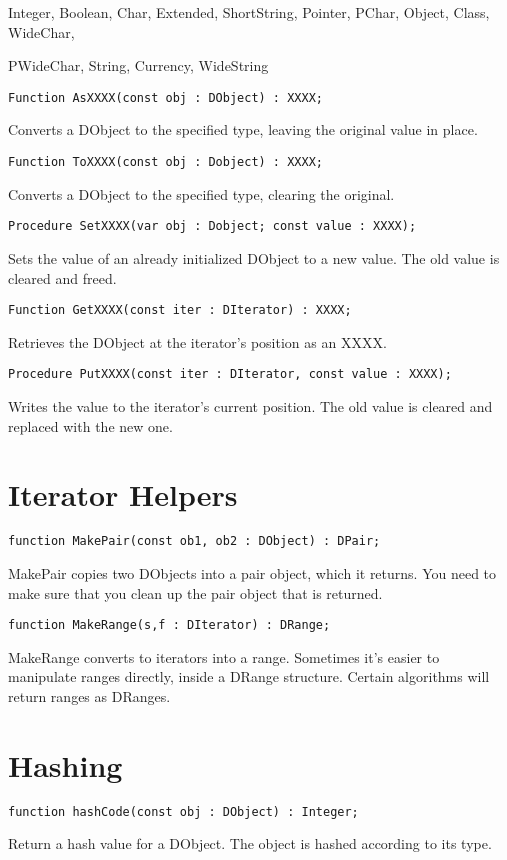 \documentclass{report}
\begin{document}
Integer, Boolean, Char, Extended, ShortString, Pointer, PChar, 
Object, Class, WideChar,

PWideChar, String, Currency, WideString

\lstinline|Function AsXXXX(const obj : DObject) : XXXX;|

Converts a DObject to the specified type, leaving the 
original value in place.

\lstinline|Function ToXXXX(const obj : Dobject) : XXXX;|

Converts a DObject to the specified type, clearing the 
original.

\lstinline|Procedure SetXXXX(var obj : Dobject; const value : XXXX);|

Sets the value of an already initialized DObject to a 
new value. The old value is cleared and freed.

\lstinline|Function GetXXXX(const iter : DIterator) : XXXX;|

Retrieves the DObject at the iterator's position as an XXXX.

\lstinline|Procedure PutXXXX(const iter : DIterator, const value : XXXX);|

Writes the value to the iterator's current position. 
The old value is cleared and replaced with the new one.

\section{Iterator Helpers}

\lstinline|function MakePair(const ob1, ob2 : DObject) : DPair;|

MakePair copies two DObjects into a pair object, which it returns. You need
to make sure that you clean up the pair object that is returned.

\lstinline|function MakeRange(s,f : DIterator) : DRange;|

MakeRange converts to iterators into a range. Sometimes it's easier to
manipulate ranges directly, inside a DRange structure. Certain algorithms
will return ranges as DRanges.

\section{Hashing}

\lstinline|function hashCode(const obj : DObject) : Integer;|

Return a hash value for a DObject. The object is hashed 
according to its type.
\end{document}
